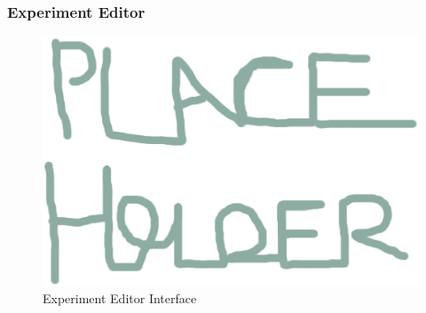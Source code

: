 \documentclass[article]{ij4uq}              %
\begin{document}


\subsubsection{Experiment Editor}

\begin{figure}[h!]
 \centering
 \includegraphics[width=5.0in]{figures/place.eps}
 \caption{Experiment Editor Interface}
 \label{fig:eeInterface}
\end{figure}
\FloatBarrier
\end{document}
